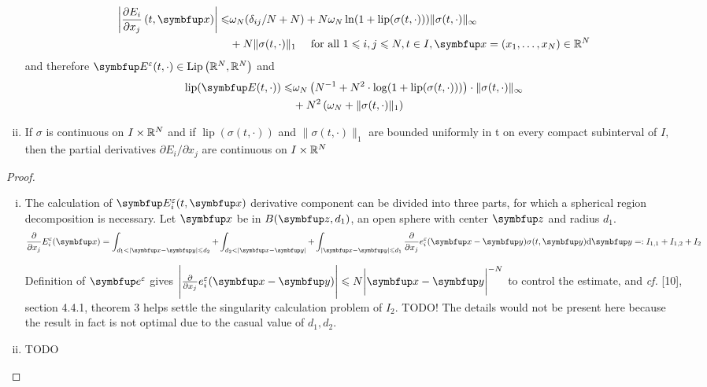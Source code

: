\begin{lemma}
\begin{lemma}
\begin{enumerate}[(i)]
    \[
    \begin{aligned}
        \left|\frac{\partial E_{i}}{\partial x_{j}}\left(t, \vx\right)\right| \leqslant &\omega_{N} ( \delta_{i j}/N+N) + N \omega_N \ln (1+\operatorname{lip}(\sigma(t, \cdot))) \|\sigma(t, \cdot)\|_{\infty} \\
          &+ N\|\sigma(t, \cdot)\|_{1} 
    \quad \text { for all } 1 \leqslant i, j \leqslant N, t \in I, \vx=\left(x_{1}, \ldots, x_{N}\right) \in \bbR^{N}
    \end{aligned}
    \]
    and therefore $\vE^\varepsilon(t, \cdot) \in \operatorname{Lip}\left(\bbR^{N}, \bbR^{N}\right)$ and
    \[
    \begin{aligned}
    \operatorname{lip}(\vE(t, \cdot)) \leqslant & \omega_{N}\left(N^{-1}+N^{2} \cdot \log (1+\operatorname{lip}(\sigma(t, \cdot)))\right) \cdot\|\sigma(t, \cdot)\|_{\infty} \\
    &+N^{2}\left(\omega_{N}+\|\sigma(t, \cdot)\|_{1}\right)
    \end{aligned}
    \]
    \item If $\sigma$ is continuous on $I \times {\mathbb{R}}^{N}$ and if $\operatorname{lip}(\sigma(t, \cdot))$ and $\|\sigma(t, \cdot)\|_{1}$ are bounded uniformly in t on every compact subinterval of $I,$ then the partial derivatives
    $\partial E_{i} / \partial x_{j}$ are continuous on $I \times {\mathbb{R}}^{N}$
    
\end{enumerate}

\end{lemma}

\begin{proof}
    \begin{enumerate}[(i)]
        \item The calculation of $\vE_i^\varepsilon(t,\vx)$ derivative component can be divided into three parts, for which a spherical region decomposition is necessary. Let $\vx$ be in $B(\vect{z},d_1)$, an open sphere with center $\vect{z}$ and radius $d_1$. 
        \begin{equation}
            \frac{\partial}{\partial x_j} E_i^\varepsilon(\vx)= \int_{d_1<|\vx-\vy|\leqslant d_2}+\int_{d_2<|\vx-\vy|}+\int_{|\vx-\vy|\leqslant d_1} \frac{\partial}{\partial x_j} e_i^\varepsilon (\vx - \vy) \sigma(t,\vy)\mathrm{d} \vy  =: I_{1,1} + I_{1,2} +I_{2}
        \end{equation}
    
        Definition of $\vect{e}^\varepsilon$ gives $\Biggl|\frac{\partial}{\partial x_j} e_i^\varepsilon(\vx-\vy) \Biggr|\leqslant N\bigg|\vx-\vy\bigg|^{-N}$ to control the estimate, and \textit{cf.} [10], section 4.4.1, theorem 3 helps settle the singularity calculation problem of $I_2$. 
         TODO!
        The details would not be present here because the result in fact is not optimal due to the casual value of $d_1, d_2$. 
        \item TODO 
    \end{enumerate}


\end{proof}
\end{lemma}
